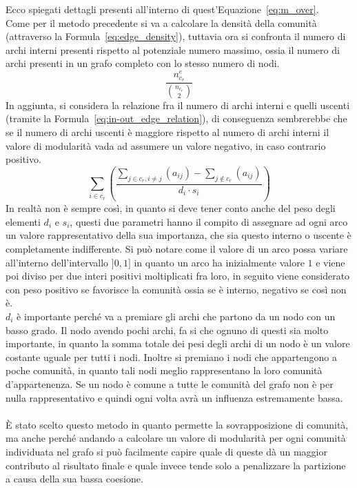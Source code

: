 %
Ecco spiegati dettagli presenti all'interno di quest'Equazione~\ref{eq:m_over}.\\
Come per il metodo precedente si va a calcolare la densità della comunità (attraverso la Formula~\ref{eq:edge_density}), tuttavia ora si confronta il numero di archi interni presenti rispetto al potenziale numero massimo, ossia il numero di archi presenti in un grafo completo con lo stesso numero di nodi.
\begin{equation}
	\frac{ n^e_{c_r} }{ \binom{n_{c_r}}{2} }
	\label{eq:edge_density}
\end{equation}
%
In aggiunta, si considera la relazione fra il numero di archi interni e quelli uscenti (tramite la Formula~\ref{eq:in-out_edge_relation}), di conseguenza sembrerebbe che se il numero di archi uscenti è maggiore rispetto al numero di archi interni il valore di modularità vada ad assumere un valore negativo, in caso contrario positivo.\\
\begin{equation}
	\sum\limits_{i \in c_r} \left( \frac{
		\sum\limits_{j \in c_r, i \neq j} \left( a_{ij} \right) - 
		\sum\limits_{j \notin c_r} \left( a_{ij} \right) 
	} {d_i \cdot s_i} \right)
	\label{eq:in-out_edge_relation}
\end{equation}
In realtà non è sempre così, in quanto si deve tener conto anche del peso degli elementi $d_i$ e $s_i$, questi due parametri hanno il compito di assegnare ad ogni arco un valore rappresentativo della sua importanza, che sia questo interno o uscente è completamente indifferente. Si può notare come il valore di un arco possa variare all'interno dell'intervallo $]0, 1]$ in quanto un arco ha inizialmente valore $1$ e viene poi diviso per due interi positivi moltiplicati fra loro, in seguito viene considerato con peso positivo se favorisce la comunità ossia se è interno, negativo se così non è.\\
$d_i$ è importante perché va a premiare gli archi che partono da un nodo con un basso grado. Il nodo avendo pochi archi, fa si che ognuno di questi sia molto importante, in quanto la somma totale dei pesi degli archi di un nodo è un valore costante uguale per tutti i nodi. Inoltre si premiano i nodi che appartengono a poche comunità, in quanto tali nodi meglio rappresentano la loro comunità d'appartenenza. Se un nodo è comune a tutte le comunità del grafo non è per nulla rappresentativo e quindi ogni volta avrà un influenza estremamente bassa.\\
\\
È stato scelto questo metodo in quanto permette la sovrapposizione di comunità, ma anche perché andando a calcolare un valore di modularità per ogni comunità individuata nel grafo si può facilmente capire quale di queste dà un maggior contributo al risultato finale e quale invece tende solo a penalizzare la partizione a causa della sua bassa coesione.\\
